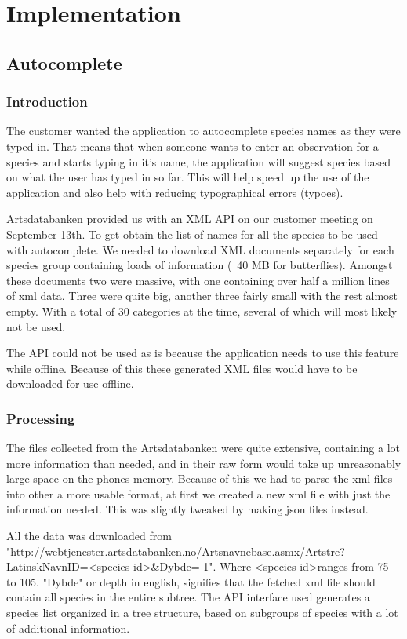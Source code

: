 \section{Implementation}

\subsection{Autocomplete}

	\subsubsection{Introduction}
	The customer wanted the application to autocomplete species names as they were typed in. 
	That means that when someone wants to enter an observation for a species and starts typing in it's name, the application will suggest species based on what the user has typed in so far. 
	This will help speed up the use of the application and also help with reducing typographical errors (typoes).

	Artsdatabanken provided us with an XML API on our customer meeting on September 13th. 
	To get obtain the list of names for all the species to be used with autocomplete. 
	We needed to download XML documents separately for each species group containing loads of information (~40 MB for butterflies).
	Amongst these documents two were massive, with one containing over half a million lines of xml data. 
	Three were quite big, another three fairly small with the rest almost empty. With a total of 30 categories at the time, several of which will most likely not be used.

	The API could not be used as is because the application needs to use this feature while offline. Because of this these generated XML files would have to be downloaded for use offline.

	\subsubsection{Processing}
	The files collected from the Artsdatabanken were quite extensive, containing a lot more information than needed, and in their raw form would take up unreasonably large space on the phones memory. 
	Because of this we had to parse the xml files into other a more usable format, at first we created a new xml file with just the information needed. 
	This was slightly tweaked by making json files instead.

	All the data was downloaded from
\newline"http://webtjenester.artsdatabanken.no/Artsnavnebase.asmx/Artstre? \newline LatinskNavnID=\textless species id\textgreater\&Dybde=-1".
	Where \textless species id\textgreater ranges from 75 to 105. "Dybde" or depth in english, signifies that the fetched xml file should contain all species in the entire subtree.
	The API interface used generates a species list organized in a tree structure, based on subgroups of species with a lot of additional information.

